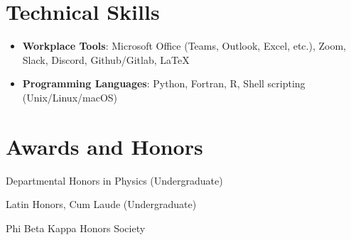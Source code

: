 \documentclass[letterpaper,10.8pt]{article}
\newcommand{\resumeItem}[2]{
  \item\small{
    \textbf{#1}{: #2 \vspace{-2pt}}
  }
}
\newcommand{\resumeSubItem}[2]{\resumeItem{#1}{#2}\vspace{-4pt}}
\newcommand{\resumeSubHeadingListStart}{\begin{itemize}[leftmargin=*]}
\newcommand{\resumeSubHeadingListEnd}{\end{itemize}}
\begin{document}
%
\section{Technical Skills}
	\resumeSubHeadingListStart
	\resumeSubItem{Workplace Tools}{Microsoft Office (Teams, Outlook, Excel, etc.), Zoom, Slack, Discord, Github/Gitlab, \LaTeX}
	\resumeSubItem{Programming Languages}{Python, Fortran, R, Shell
scripting (Unix/Linux/macOS)}
	
\resumeSubHeadingListEnd 


\section{Awards and Honors}
\begin{description}[font=$\bullet$]
\item {Departmental Honors in Physics
(Undergraduate)} 
\item {Latin Honors, Cum Laude
(Undergraduate)}
\item {Phi Beta Kappa Honors Society}
\end{description}
\end{document}
